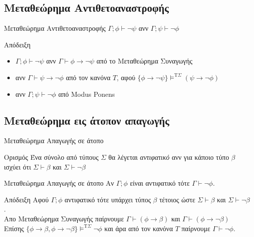 \documentclass{beamer}
\begin{document}
\subsection{Μεταθεώρημα Αντιθετοαναστροφής}

\begin{frame}{Μεταθεώρημα Αντιθετοαναστροφής}
  $\Gamma ; \phi \vdash \neg\psi$ ανν $\Gamma ; \psi \vdash \neg\phi$
  \begin{block}{Απόδειξη}
    \begin{itemize}
      \item[] $\Gamma ; \phi \vdash \neg\psi$ ανν $\Gamma \vdash \phi \rightarrow \neg\psi$ από το Μεταθεώρημα Συναγωγής
      \item[] ανν $\Gamma \vdash \psi \rightarrow \neg\phi$ από τον κανόνα $T$, αφού $\{\phi \rightarrow \neg\psi\} \models^{\textrm{T}\Sigma} (\psi \rightarrow \neg\phi)$
      \item[] ανν $\Gamma ; \psi \vdash \neg\phi$ από Modus Ponens
    \end{itemize}
  \end{block}
\end{frame}

\subsection{Μεταθεώρημα εις άτοπον απαγωγής}

\begin{frame}{Μεταθεώρημα Απαγωγής σε άτοπο}
  \begin{block}{Ορισμός}
    Ένα σύνολο από τύπους $\Sigma$ θα λέγεται \textit{αντιφατικό} ανν για κάποιο τύπο $\beta$  ισχύει ότι $\Sigma \vdash \beta$ και $\Sigma \vdash \neg\beta$
  \end{block}
  
  \begin{block}{Μεταθεώρημα Απαγωγής σε άτοπο}
    Αν $\Gamma ; \phi$ είναι αντιφατικό τότε $\Gamma \vdash \neg\phi$.
  \end{block}
  
  \begin{block}{Απόδειξη}
    Αφού $\Gamma ; \phi$ αντιφατικό τότε υπάρχει τύπος $\beta$ τέτοιος ώστε $\Sigma \vdash \beta$ και $\Sigma \vdash \neg\beta$.\\
    Απο Μεταθεώρημα Συναγωγής παίρνουμε $\Gamma \vdash (\phi \rightarrow \beta)$ και $\Gamma \vdash (\phi \rightarrow \neg\beta)$\\
    Επίσης $\{\phi \rightarrow \beta, \phi \rightarrow \neg\beta\} \models^{\textrm{T}\Sigma} \neg\phi$ και άρα από τον κανόνα $T$ παίρνουμε $\Gamma \vdash \neg\phi$.
  \end{block}
\end{frame}
\end{document}
